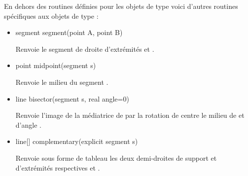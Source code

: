 \documentclass[pdftex]{article}
\begin{document}
En dehors des routines définies pour les objets de type 
voici d'autres routines spécifiques aux objets de type :
\begin{itemize}
\item {}%
  \begin{Vcolor}
    segment segment(point A, point B)
  \end{Vcolor}
  Renvoie le segment de droite d'extrémités  et .
\item {}%
  \begin{Vcolor}
    point midpoint(segment s)
  \end{Vcolor}
  Renvoie le milieu du segment .
\item {}%
  \begin{Vcolor}
    line bisector(segment s, real angle=0)
  \end{Vcolor}
  Renvoie l'image de la médiatrice de  par la rotation de
  centre \og{}le milieu de \fg{} et d'angle .
\item {}%
  \begin{Vcolor}
    line[] complementary(explicit segment s)
  \end{Vcolor}
  Renvoie sous forme de tableau les deux demi-droites de
  support  et d'extrémités respectives  et .
\end{itemize}
\end{document}
